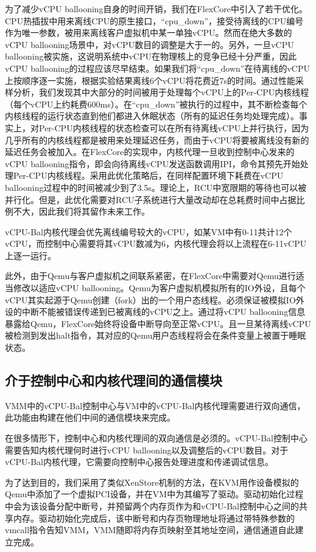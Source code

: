 为了减少vCPU ballooning自身的时间开销，我们在FlexCore中引入了若干优化。CPU热插拔中用来离线CPU的原生接口，``cpu\_down''，接受待离线的CPU编号作为唯一参数，被用来离线客户虚拟机中某一单独vCPU。然而在绝大多数的vCPU ballooning场景中，对vCPU数目的调整是大于一的。另外，一旦vCPU ballooning被实施，这说明系统中vCPU在物理核上的竞争已经十分严重，因此vCPU ballooning的过程应该尽早结束。如果我们将``cpu\_down''在待离线的vCPU上按顺序逐一实施，根据实验结果离线6个vCPU将花费近7s的时间。通过性能采样分析，我们发现其中大部分的时间被用于处理每个vCPU上的Per-CPU内核线程（每个vCPU上约耗费600ms）。在``cpu\_down''被执行的过程中，其不断检查每个内核线程的运行状态直到他们都进入休眠状态（所有的延迟任务均处理完成）。事实上，对Per-CPU内核线程的状态检查可以在所有待离线vCPU上并行执行，因为几乎所有的内核线程都是被用来处理延迟任务，而由于vCPU将要被离线没有新的延迟任务会被加入。在FlexCore的实现中，内核代理一旦收到控制中心发来的vCPU ballooning指令，即会向待离线vCPU发送函数调用IPI，命令其预先开始处理Per-CPU内核线程。采用此优化策略后，在同样配置环境下耗费在vCPU ballooning过程中的时间被减少到了3.5s。理论上，RCU中宽限期的等待也可以被并行化。但是，此优化需要对RCU子系统进行大量改动却在总耗费时间中占据比例不大，因此我们将其留作未来工作。

vCPU-Bal内核代理会优先离线编号较大的vCPU，如某VM中有0-11共计12个vCPU，而控制中心需要将其vCPU数减为6，内核代理会将以上流程在6-11vCPU上逐一运行。

此外，由于Qemu\cite{bellard2005qemu}与客户虚拟机之间联系紧密，在FlexCore中需要对Qemu进行适当修改以适应vCPU ballooning。Qemu为客户虚拟机模拟所有的IO外设，且每个vCPU其实起源于Qemu创建（fork）出的一个用户态线程。必须保证被模拟IO外设的中断不能被错误传递到已被离线的vCPU之上。通过将vCPU ballooning信息暴露给Qemu，FlexCore始终将设备中断导向至正常vCPU。且一旦某待离线vCPU被检测到发出halt指令，其对应的Qemu用户态线程将会在条件变量上被置于睡眠状态。

\subsection{介于控制中心和内核代理间的通信模块}

VMM中的vCPU-Bal控制中心与VM中的vCPU-Bal内核代理需要进行双向通信，此功能由构建在他们中间的通信模块来完成。

在很多情形下，控制中心和内核代理间的双向通信是必须的。vCPU-Bal控制中心需要告知内核代理何时进行vCPU ballooning以及调整后的vCPU数目。对于vCPU-Bal内核代理，它需要向控制中心报告处理进度和传递调试信息。

为了达到目的，我们采用了类似XenStore\cite{barham2003xen}机制的方法，在KVM用作设备模拟的Qemu中添加了一个虚拟PCI设备，并在VM中为其编写了驱动。驱动初始化过程中会为该设备分配中断号，并预留两个内存页作为和vCPU-Bal控制中心之间的共享内存。驱动初始化完成后，该中断号和内存页物理地址将通过带特殊参数的vmcall\cite{guide2010intel}指令告知VMM，VMM随即将内存页映射至其地址空间，通信通道自此建立完成。

